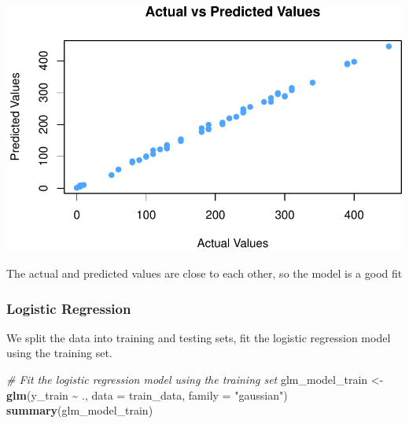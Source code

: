 \documentclass[
]{article}
\newenvironment{Shaded}{\begin{snugshade}}{\end{snugshade}}
\newcommand{\AttributeTok}[1]{\textcolor[rgb]{0.13,0.29,0.53}{#1}}
\newcommand{\CommentTok}[1]{\textcolor[rgb]{0.56,0.35,0.01}{\textit{#1}}}
\newcommand{\FunctionTok}[1]{\textcolor[rgb]{0.13,0.29,0.53}{\textbf{#1}}}
\newcommand{\NormalTok}[1]{#1}
\newcommand{\OtherTok}[1]{\textcolor[rgb]{0.56,0.35,0.01}{#1}}
\newcommand{\SpecialCharTok}[1]{\textcolor[rgb]{0.81,0.36,0.00}{\textbf{#1}}}
\newcommand{\StringTok}[1]{\textcolor[rgb]{0.31,0.60,0.02}{#1}}
\begin{document}
\begin{center}\includegraphics{Statistical_Learning_Final_Report_files/figure-latex/accuracy_lm-1} \end{center}

The actual and predicted values are close to each other, so the model is
a good fit

\subsubsection{Logistic Regression}\label{logistic-regression-1}

We split the data into training and testing sets, fit the logistic
regression model using the training set.

\begin{Shaded}
\begin{Highlighting}[]
\CommentTok{\# Fit the logistic regression model using the training set}
\NormalTok{glm\_model\_train }\OtherTok{\textless{}{-}} \FunctionTok{glm}\NormalTok{(y\_train }\SpecialCharTok{\textasciitilde{}}\NormalTok{ ., }\AttributeTok{data =}\NormalTok{ train\_data, }\AttributeTok{family =} \StringTok{"gaussian"}\NormalTok{)}
\FunctionTok{summary}\NormalTok{(glm\_model\_train)}
\end{Highlighting}
\end{Shaded}
\end{document}
